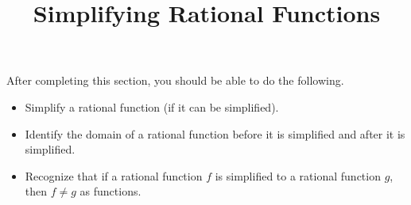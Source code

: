 \documentclass{ximera}
\title{Simplifying Rational Functions}
\begin{document}
\begin{abstract} 
\end{abstract}

\maketitle

\begin{sectionOutcomes}
After completing this section, you should be able to do the following.

\begin{itemize}
	\item Simplify a rational function (if it can be simplified).
    \item Identify the domain of a rational function before it is simplified and after it is simplified.
    \item Recognize that if a rational function $f$ is simplified to a rational function $g$, then $f \neq g$ as functions. 

\end{itemize}
\end{sectionOutcomes}
\end{document}
